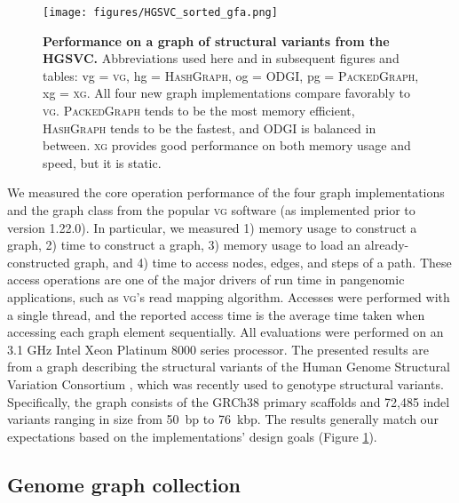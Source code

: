 \documentclass{bioinfo}
\begin{document}
\begin{figure}
	\begin{center}
		\texttt{[image: figures/HGSVC\_sorted\_gfa.png]}
	\end{center}
	\caption{{\label{fig:hgsvc}
        \textbf{Performance on a graph of structural variants from the HGSVC.}
        Abbreviations used here and in subsequent figures and tables: vg = \textsc{vg}, hg = \textsc{HashGraph}, og = \textsc{ODGI}, pg = \textsc{PackedGraph}, xg = \textsc{xg}.
        All four new graph implementations compare favorably to \textsc{vg}.
        \textsc{PackedGraph} tends to be the most memory efficient, \textsc{HashGraph} tends to be the fastest, and \textsc{ODGI} is balanced in between.
        \textsc{xg} provides good performance on both memory usage and speed, but it is static.
        }
      }
\end{figure}

We measured the core operation performance of the four graph implementations and the graph class from the popular \textsc{vg} software (as implemented prior to version 1.22.0).
In particular, we measured 1) memory usage to construct a graph, 2) time to construct a graph, 3) memory usage to load an already-constructed graph, and 4) time to access nodes, edges, and steps of a path.
These access operations are one of the major drivers of run time in pangenomic applications, such as \textsc{vg}'s read mapping algorithm. 
Accesses were performed with a single thread, and the reported access time is the average time taken when accessing each graph element sequentially.
All evaluations were performed on an 3.1 GHz Intel Xeon Platinum 8000 series processor.
The presented results are from a graph describing the structural variants of the Human Genome Structural Variation Consortium \citep{chaisson2019multi}, which was recently used to genotype structural variants\citep{hickey2020genotyping}.
Specifically, the graph consists of the GRCh38 primary scaffolds and 72,485 indel variants ranging in size from 50~bp to 76~kbp.
The results generally match our expectations based on the implementations' design goals (Figure \ref{fig:hgsvc}).

\subsection{Genome graph collection}
\end{document}
